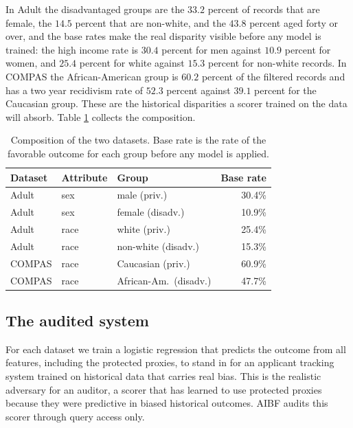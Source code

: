 \documentclass[conference]{IEEEtran}
\begin{document}
In Adult the disadvantaged groups are the $33.2$ percent of records that are female,
the $14.5$ percent that are non-white, and the $43.8$ percent aged forty or over, and
the base rates make the real disparity visible before any model is trained: the high
income rate is $30.4$ percent for men against $10.9$ percent for women, and $25.4$
percent for white against $15.3$ percent for non-white records. In COMPAS the
African-American group is $60.2$ percent of the filtered records and has a two year
recidivism rate of $52.3$ percent against $39.1$ percent for the Caucasian group.
These are the historical disparities a scorer trained on the data will absorb.
Table \ref{tab:composition} collects the composition.

\begin{table}[t]
\caption{Composition of the two datasets. Base rate is the rate of the favorable
outcome for each group before any model is applied.}
\label{tab:composition}
\centering
\footnotesize
\begin{tabular}{@{}lllr@{}}
\toprule
Dataset & Attribute & Group & Base rate \\
\midrule
Adult  & sex  & male (priv.)        & 30.4\% \\
Adult  & sex  & female (disadv.)    & 10.9\% \\
Adult  & race & white (priv.)       & 25.4\% \\
Adult  & race & non-white (disadv.) & 15.3\% \\
COMPAS & race & Caucasian (priv.)   & 60.9\% \\
COMPAS & race & African-Am.\ (disadv.) & 47.7\% \\
\bottomrule
\end{tabular}
\end{table}

\subsection{The audited system}
For each dataset we train a logistic regression that predicts the outcome from all
features, including the protected proxies, to stand in for an applicant tracking
system trained on historical data that carries real bias. This is the realistic
adversary for an auditor, a scorer that has learned to use protected proxies because
they were predictive in biased historical outcomes. AIBF audits this scorer through
query access only.
\end{document}
